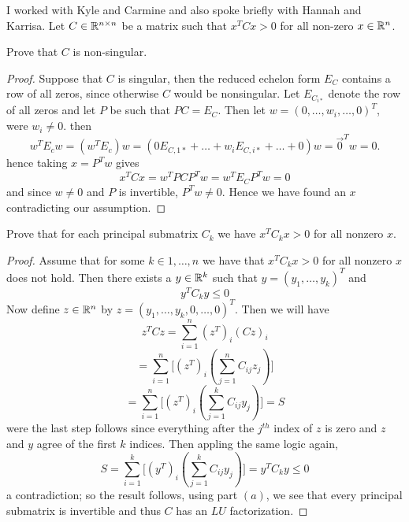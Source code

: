 



\maketitle 

I worked with Kyle and Carmine and also spoke briefly with Hannah and Karrisa. 
\question 
Let $C \in \mathbb{R}^{n \times n}$ be a matrix such that $x^TCx>0$ for all non-zero $x \in \mathbb{R}^n$. 

\begin{alphaparts}
    \questionpart 
    Prove that $C$ is non-singular. 
    
    \begin{proof}
        Suppose that $C$ is singular, then the reduced echelon form $E_C$ contains a row of 
        all zeros, since otherwise $C$ would be nonsingular. Let $E_{C_{i \ast}}$ denote the row of all zeros and 
        let $P$ be such that $PC = E_C$. Then let $w = (0, \dots, w_i, \dots, 0)^T$, were $w_i \neq 0$. 
        then 
        \[w^T E_c w = (w^T E_c) w = (0 E_{C,1 \ast} + \dots + w_i E_{C,i \ast} + \dots + 0) w = \vec{0}^T w = 0.\] 
        hence taking $x = P^T w$ gives
        \[x^TCx = w^T P C P^Tw = w^T E_C P^Tw = 0 \]
        and since $w \neq 0$ and $P$ is invertible, $P^Tw \neq 0$. Hence we have found an $x$ contradicting our assumption. 
    \end{proof}

    \questionpart 
    Prove that for each principal submatrix $C_k$ we have $x^TC_kx> 0$ for all nonzero $x$. 

    \begin{proof}
        Assume that for some $k \in 1, \dots, n$ we have that $x^T C_k x >0 $ for all nonzero $x$ does not hold. 
        Then there exists a $y \in \mathbb{R}^k$ such that $y = (y_1, \dots, y_k)^T$ and 
        \[y^T C_k y \leq 0\]
        Now define $z \in \mathbb{R}^n$ by $z = (y_1, \dots, y_k, 0, \dots, 0)^T$. 
        Then we will have 
        \[z^T C z = \sum_{i = 1}^n (z^T)_i (Cz)_i\]
        \[= \sum_{i = 1}^n \Big[(z^T)_i \left(\sum_{j= 1}^n C_{ij}z_j\right)\Big]\]
        \[= \sum_{i = 1}^n \Big[(z^T)_i \left(\sum_{j = 1}^k C_{ij} y_j\right)\Big] = S\]
        were the last step follows since everything after the $j^{th}$ index of $z$ is zero and $z$ and $y$ agree of the first $k$ indices. Then appling the same logic again,
        \[S = \sum_{i = 1}^k \Big[(y^T)_i \left(\sum_{j = 1}^k C_{ij} y_j\right)\Big] = y^TC_ky \leq 0\]
        a contradiction; so the result follows, using part $(a)$, we see that every principal submatrix is invertible and thus $C$ has an $LU$ factorization.
    \end{proof}

\end{alphaparts}

